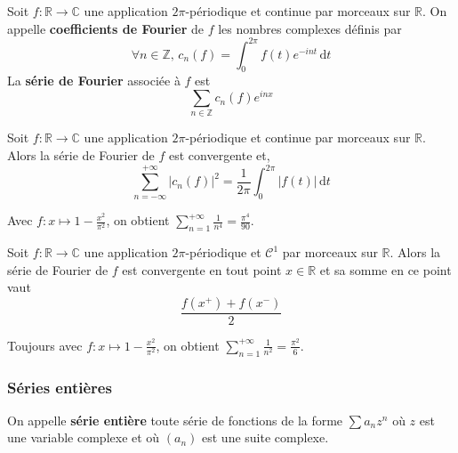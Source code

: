 
  \begin{definition}
    Soit $f : \mathbb{R} \rightarrow \mathbb{C}$ une application $2\pi$-périodique et continue par morceaux sur $\mathbb{R}$. On appelle \textbf{coefficients de Fourier} de $f$ les nombres complexes définis par
    \[ \forall n \in \mathbb{Z}, \, c_n(f) = \int_{0}^{2\pi} f(t) e^{-int} \, \mathrm{d}t \]
    La \textbf{série de Fourier} associée à $f$ est
    \[ \sum_{n \in \mathbb{Z}} c_n(f)e^{inx} \]
  \end{definition}

  \begin{theorem}[Parseval]
    Soit $f : \mathbb{R} \rightarrow \mathbb{C}$ une application $2\pi$-périodique et continue par morceaux sur $\mathbb{R}$. Alors la série de Fourier de $f$ est convergente et,
    \[ \sum_{n=-\infty}^{+\infty} |c_n(f)|^2 = \frac{1}{2\pi} \int_0^{2\pi} |f(t)| \, \mathrm{d}t \]
  \end{theorem}

  \begin{example}
    Avec $f : x \mapsto 1 - \frac{x^2}{\pi^2}$, on obtient $\sum_{n=1}^{+\infty} \frac{1}{n^4} = \frac{\pi^4}{90}$.
  \end{example}

  \begin{theorem}
    Soit $f : \mathbb{R} \rightarrow \mathbb{C}$ une application $2\pi$-périodique et $\mathcal{C}^1$ par morceaux sur $\mathbb{R}$. Alors la série de Fourier de $f$ est convergente en tout point $x \in \mathbb{R}$ et sa somme en ce point vaut
    \[ \frac{f(x^+) + f(x^-)}{2} \]
  \end{theorem}

  \begin{example}
    Toujours avec $f : x \mapsto 1 - \frac{x^2}{\pi^2}$, on obtient $\sum_{n=1}^{+\infty} \frac{1}{n^2} = \frac{\pi^2}{6}$.
  \end{example}

  \subsubsection{Séries entières}


  \begin{definition}
    On appelle \textbf{série entière} toute série de fonctions de la forme $\sum a_n z^n$ où $z$ est une variable complexe et où $(a_n)$ est une suite complexe.
  \end{definition}


